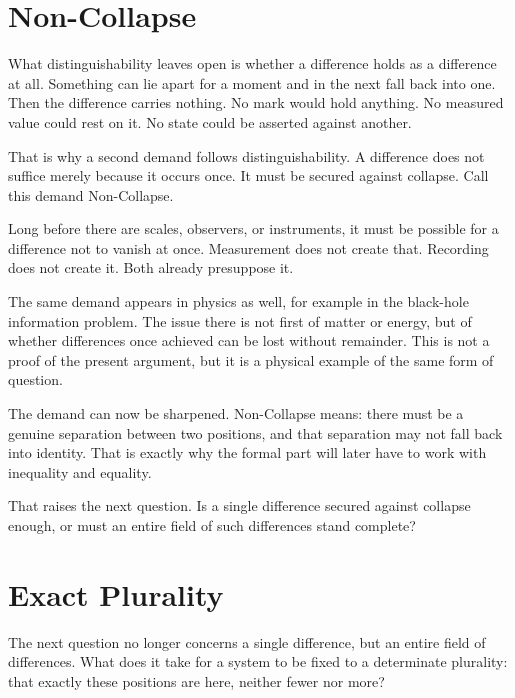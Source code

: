 \documentclass[11pt,a4paper]{book}
\begin{document}
\section{Non-Collapse}
\label{ch:reference}

What distinguishability leaves open is whether a difference holds as a
difference at all. Something can lie apart for a moment and in the next
fall back into one. Then the difference carries nothing. No mark would hold
anything. No measured value could rest on it. No state could be asserted
against another.

That is why a second demand follows distinguishability. A difference does
not suffice merely because it occurs once. It must be secured against
collapse. Call this demand Non-Collapse.

Long before there are scales, observers, or instruments, it must be
possible for a difference not to vanish at once. Measurement does not
create that. Recording does not create it. Both already presuppose it.

The same demand appears in physics as well, for example in the black-hole
information problem. The issue there is not first of matter or energy, but
of whether differences once achieved can be lost without remainder. This is
not a proof of the present argument, but it is a physical example of the
same form of question.

The demand can now be sharpened. Non-Collapse means: there must be a genuine
separation between two positions, and that separation may not fall back into
identity. That is exactly why the formal part will later have to work with
inequality and equality.

That raises the next question. Is a single difference secured against
collapse enough, or must an entire field of such differences stand complete?

\section{Exact Plurality}
\label{ch:plurality}

The next question no longer concerns a single difference, but an entire
field of differences. What does it take for a system to be fixed to a
determinate plurality: that exactly these positions are here, neither fewer
nor more?
\end{document}

